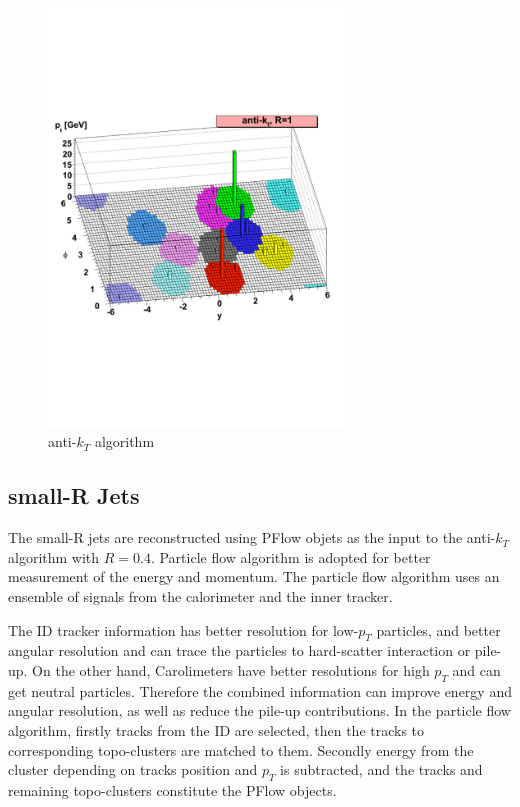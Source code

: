 \begin{figure}[tbp]
\begin{center}
 \includegraphics[width=0.70\textwidth,keepaspectratio]{figures/Reconstruction/antikt}
\caption{
anti-$k_T$ algorithm \cite{Cacciari_2008}
}
\label{fig:antikt}
\end{center}
\end{figure}

\subsection{small-R Jets}
The small-R jets are reconstructed using PFlow objets as the input to the anti-$k_T$ algorithm with $R = 0.4$. Particle flow algorithm \cite{PERF-2015-09} is adopted for better measurement of the energy and momentum. The particle flow algorithm uses an ensemble of signals from the calorimeter and the inner tracker. 

The ID tracker information has better resolution for low-$p_T$ particles, and better angular resolution and can trace the particles to hard-scatter
interaction or pile-up. On the other hand, Carolimeters have better resolutions for high $p_T$ and can get neutral particles. Therefore the combined information can improve energy and angular resolution, as well as reduce the pile-up contributions.
In the particle flow algorithm, firstly tracks from the ID are selected, then the tracks to corresponding topo-clusters are matched to them. Secondly energy from the cluster depending on tracks position and $p_T$ is subtracted, and the tracks and remaining topo-clusters constitute the PFlow objects.

